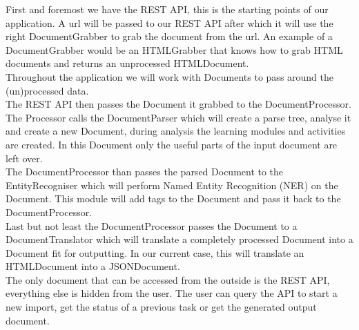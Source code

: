 \documentclass[a4paper,12pt]{article}
\begin{document}
First and foremost we have the REST API, this is the starting points of our application. A url will be passed to our REST API after which it will use the right DocumentGrabber to grab the document from the url. An example of a DocumentGrabber would be an HTMLGrabber that knows how to grab HTML documents and returns an unprocessed HTMLDocument.\\
Throughout the application we will work with Documents to pass around the (un)processed data.\\
The REST API then passes the Document it grabbed to the DocumentProcessor. The Processor calls the DocumentParser which will create a parse tree, analyse it and create a new Document, during analysis the learning modules and activities are created. In this Document only the useful parts of the input document are left over.\\
The DocumentProcessor than passes the parsed Document to the EntityRecogniser which will perform Named Entity Recognition (NER) on the Document. This module will add tags to the Document and pass it back to the DocumentProcessor.\\
Last but not least the DocumentProcessor passes the Document to a DocumentTranslator which will translate a completely processed Document into a Document fit for outputting. In our current case, this will translate an HTMLDocument into a JSONDocument.\\

The only document that can be accessed from the outside is the REST API, everything else is hidden from the user. The user can query the API to start a new import, get the status of a previous task or get the generated output document.
\end{document}
